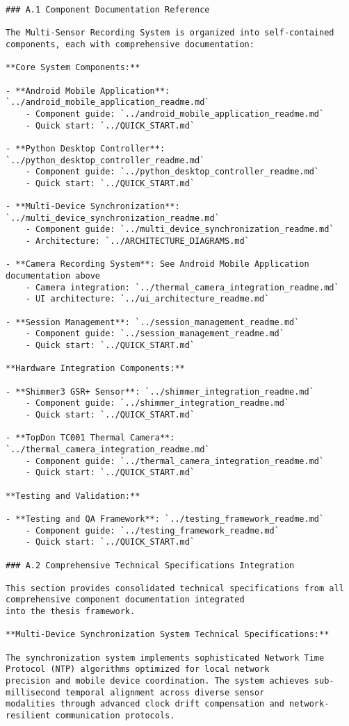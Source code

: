 \documentclass[11pt,a4paper]{report}
\begin{document}
\begin{verbatim}
### A.1 Component Documentation Reference

The Multi-Sensor Recording System is organized into self-contained components, each with comprehensive documentation:

**Core System Components:**

- **Android Mobile Application**: `../android_mobile_application_readme.md`
    - Component guide: `../android_mobile_application_readme.md`
    - Quick start: `../QUICK_START.md`

- **Python Desktop Controller**: `../python_desktop_controller_readme.md`
    - Component guide: `../python_desktop_controller_readme.md`
    - Quick start: `../QUICK_START.md`

- **Multi-Device Synchronization**: `../multi_device_synchronization_readme.md`
    - Component guide: `../multi_device_synchronization_readme.md`
    - Architecture: `../ARCHITECTURE_DIAGRAMS.md`

- **Camera Recording System**: See Android Mobile Application documentation above
    - Camera integration: `../thermal_camera_integration_readme.md`
    - UI architecture: `../ui_architecture_readme.md`

- **Session Management**: `../session_management_readme.md`
    - Component guide: `../session_management_readme.md`
    - Quick start: `../QUICK_START.md`

**Hardware Integration Components:**

- **Shimmer3 GSR+ Sensor**: `../shimmer_integration_readme.md`
    - Component guide: `../shimmer_integration_readme.md`
    - Quick start: `../QUICK_START.md`

- **TopDon TC001 Thermal Camera**: `../thermal_camera_integration_readme.md`
    - Component guide: `../thermal_camera_integration_readme.md`
    - Quick start: `../QUICK_START.md`

**Testing and Validation:**

- **Testing and QA Framework**: `../testing_framework_readme.md`
    - Component guide: `../testing_framework_readme.md`
    - Quick start: `../QUICK_START.md`

### A.2 Comprehensive Technical Specifications Integration

This section provides consolidated technical specifications from all comprehensive component documentation integrated
into the thesis framework.

**Multi-Device Synchronization System Technical Specifications:**

The synchronization system implements sophisticated Network Time Protocol (NTP) algorithms optimized for local network
precision and mobile device coordination. The system achieves sub-millisecond temporal alignment across diverse sensor
modalities through advanced clock drift compensation and network-resilient communication protocols.


\end{verbatim}
\end{document}
